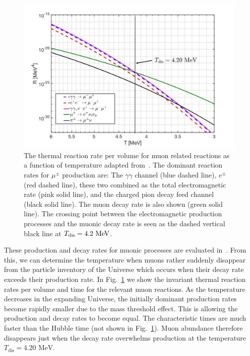 \documentclass[universe,article,submit,moreauthors,pdftex,a4paper]{Definitions/mdpi}
\newcommand{\MeV}{\text{ MeV}}
\newcommand*{\rf}[1]{Fig.~{\ref{#1}}}
\newcommand*{\xblue}{\color{blue}}
\begin{document}
\begin{figure}[ht]
\centering
\includegraphics[width=0.9\columnwidth]{./plots/MuonRate_new2.jpg}
\caption{The thermal reaction rate per volume for muon related reactions as a function of temperature adapted from~\cite{Rafelski:2021aey}. {\xblue The dominant reaction rates for $\mu^\pm$ production are: The $\gamma\gamma$ channel (blue dashed line), $e^{\pm}$ (red dashed line), these two combined as the total electromagnetic rate (pink solid line), and the charged pion decay feed channel (black solid line). The muon decay rate is also shown (green solid line). The crossing point between the electromagnetic production processes and the muonic decay rate is seen as the dashed vertical black line at $T_{\rm dis}=4.2\MeV$.}}
\label{muon_fig} 
\end{figure}

{\xblue These production and decay rates for muonic processes are evaluated in~\cite{Rafelski:2021aey}. From this, we can determine the temperature when muons rather suddenly disappear from the particle inventory of the Universe which occurs when their decay rate exceeds their production rate.} In \rf{muon_fig} we show the invariant thermal reaction rates per volume and time for the relevant muon reactions.  {\xblue As the temperature decreases in the expanding Universe, the initially dominant production rates become rapidly smaller due to the mass threshold effect. This is allowing the production and decay rates to become equal.  The characteristic times are much faster than the Hubble time (not shown in \rf{muon_fig}). Muon abundance therefore disappears just when the decay rate overwhelms production at the temperature $T_\mathrm{dis} = 4.20\MeV$.}
\end{document}
